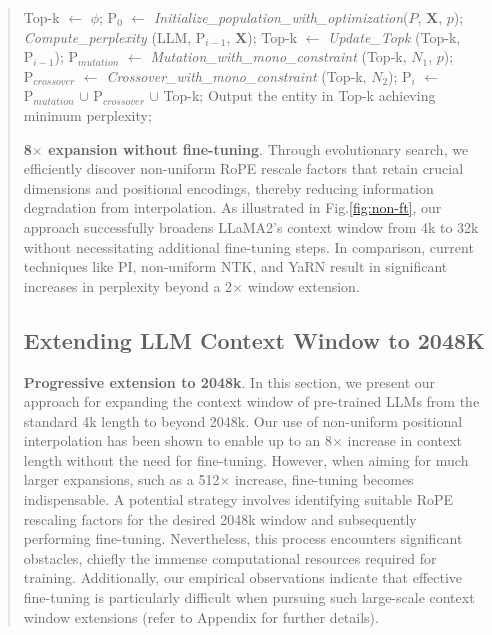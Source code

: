 \begin{abstract}
\begin{algorithm}[t]
	\begin{algorithmic}[1]
		\label{alg:search}
		\STATE Top-k $\leftarrow$ $\phi$;
		\STATE $\text{P}_0$ $\leftarrow$ \textit{Initialize\_population\_with\_optimization}($P$, $\mathbf{X}$, $p$);
		\STATE \textit{Compute\_perplexity} (LLM, $\text{P}_{i-1}$, $\mathbf{X}$);
		\STATE Top-k $\leftarrow$ \textit{Update\_Topk} (Top-k, $\text{P}_{i-1}$);
		\STATE $\text{P}_{mutation}$ $\leftarrow$ \textit{Mutation\_with\_mono\_constraint} (Top-k, $N_1$, $p$);
		\STATE $\text{P}_{crossover}$ $\leftarrow$ \textit{Crossover\_with\_mono\_constraint} (Top-k, $N_2$);
		\STATE $\text{P}_i$ $\leftarrow$ $\text{P}_{mutation}$ $\cup$ $\text{P}_{crossover}$ $\cup$ Top-k;
		\ENDFOR
		\STATE Output the entity in Top-k achieving minimum perplexity;
	\end{algorithmic}
\end{algorithm}

\textbf{8$\times$ expansion without fine-tuning}. Through evolutionary search, we efficiently discover non-uniform RoPE rescale factors that retain crucial dimensions and positional encodings, thereby reducing information degradation from interpolation. As illustrated in Fig.\ref{fig:non-ft}, our approach successfully broadens LLaMA2’s context window from 4k to 32k without necessitating additional fine-tuning steps. In comparison, current techniques like PI, non-uniform NTK, and YaRN result in significant increases in perplexity beyond a 2$\times$ window extension.

\subsection{Extending LLM Context Window to 2048K}
\label{sec:extendto2048k}

\textbf{Progressive extension to 2048k}. In this section, we present our approach for expanding the context window of pre-trained LLMs from the standard 4k length to beyond 2048k. Our use of non-uniform positional interpolation has been shown to enable up to an 8$\times$ increase in context length without the need for fine-tuning. However, when aiming for much larger expansions, such as a 512$\times$ increase, fine-tuning becomes indispensable. A potential strategy involves identifying suitable RoPE rescaling factors for the desired 2048k window and subsequently performing fine-tuning. Nevertheless, this process encounters significant obstacles, chiefly the immense computational resources required for training. Additionally, our empirical observations indicate that effective fine-tuning is particularly difficult when pursuing such large-scale context window extensions (refer to Appendix for further details).


\end{abstract}
